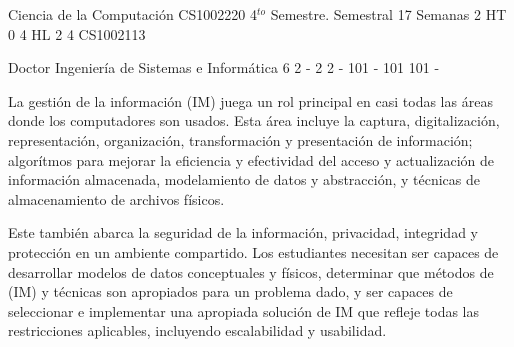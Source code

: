 \documentclass[a4paper,8pt]{article}
\begin{document}
\setNombreProfesor{}
\setGradoProfesorAbreviado{}
\sylabusHeader

\academicaTable
{Ciencia de la Computación} %
{CS1002220} %
{4$^{to}$ Semestre.} %
{Semestral} %
{17 Semanas} %
{2 HT} %
{} %
{0} %
{4 HL}  %
{2} %
{4} %
{CS1002113} %

\administrativaTable
{Doctor} %
{Ingeniería de Sistemas e Informática} %
{6} %
{2} %
{-} %
{2} %
{2} %
{-} %
{101} %
{-} %
{101} %
{101} %
{-} %


\begin{fundamentacion}
La gestión de la información (IM) juega un rol principal en casi todas las áreas donde los computadores son usados. 
Esta área incluye la captura, digitalización, representación, organización, transformación y presentación de información; 
algorítmos para mejorar la eficiencia y efectividad del acceso y actualización de información almacenada, 
modelamiento de datos y abstracción, y técnicas de almacenamiento de archivos físicos.

Este también abarca la seguridad de la información, privacidad, integridad y protección en un ambiente compartido. 
Los estudiantes necesitan ser capaces de desarrollar modelos de datos conceptuales y físicos, determinar que métodos de (IM) y 
técnicas son apropiados para un problema dado, y ser capaces de seleccionar e implementar una apropiada solución de IM 
que refleje todas las restricciones aplicables, incluyendo escalabilidad y usabilidad.

\end{fundamentacion}

\begin{sumilla}
\item \IMDatabaseSystems
\item \IMDataModeling
\item \IMIndexing
\item \IMRelationalDatabases
\item \IMQueryLanguages

\end{sumilla}
\end{document}
